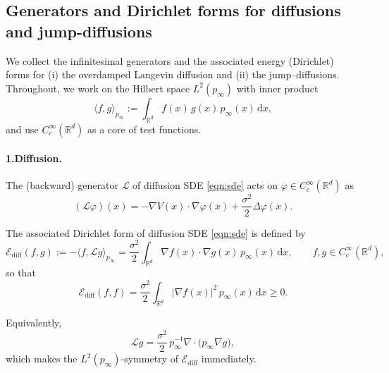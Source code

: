 \subsection{Generators and Dirichlet forms for diffusions and jump-diffusions}\label{subsubsec:gen_dirichlet}

We collect the infinitesimal generators and the associated energy (Dirichlet) forms for
(i) the overdamped Langevin diffusion and
(ii) the jump--diffusions.
Throughout, we work on the Hilbert space $L^2(p_\infty)$ with inner product
\[
\langle f,g\rangle_{p_\infty}:=\int_{\mathbb{R}^d} f(x)\,g(x)\,p_\infty(x)\,\mathrm{d}x,
\]
and use $C_c^\infty(\mathbb{R}^d)$ as a core of test functions.

\paragraph{1.Diffusion.}
The (backward) generator $\mathcal{L}$ of diffusion SDE \eqref{eqn:sde} acts on $\varphi\in C_c^\infty(\mathbb{R}^d)$ as
\begin{equation}\label{eq:generator_diffusion}
(\mathcal{L}\varphi)(x)= -\nabla V(x)\cdot\nabla\varphi(x)+\frac{\sigma^2}{2}\Delta\varphi(x).
\end{equation}
\begin{definition}
    The associated Dirichlet form of diffusion SDE \eqref{eqn:sde} is defined by
\begin{equation}\label{eq:dirichlet_diffusion}
\mathcal{E}_{\mathrm{diff}}(f,g):=-\langle f,\mathcal{L}g\rangle_{p_\infty}
=\frac{\sigma^2}{2}\int_{\mathbb{R}^d}\nabla f(x)\cdot \nabla g(x)\,p_\infty(x)\,\mathrm{d}x,
\qquad f,g\in C_c^\infty(\mathbb{R}^d),
\end{equation}
so that
\[
\mathcal{E}_{\mathrm{diff}}(f,f)=\frac{\sigma^2}{2}\int_{\mathbb{R}^d}|\nabla f(x)|^2\,p_\infty(x)\,\mathrm{d}x\ge 0.
\]
\end{definition}
Equivalently,
\begin{equation}\label{eq:generator_divergence_form}
\mathcal{L}g=\frac{\sigma^2}{2}\,p_\infty^{-1}\nabla\cdot\big(p_\infty\nabla g\big),
\end{equation}
which makes the $L^2(p_\infty)$-symmetry of $\mathcal{E}_{\mathrm{diff}}$ immediately.

